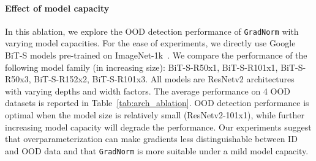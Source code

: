 \documentclass{article}
\begin{document}
\paragraph{Effect of model capacity} In this ablation, we explore the OOD detection performance of \texttt{GradNorm} with varying model capacities. For the ease of experiments, we directly use Google BiT-S models pre-trained on ImageNet-1k~\cite{deng2009imagenet}. We compare the performance of the following model family (in increasing size): BiT-S-R50x1, BiT-S-R101x1, BiT-S-R50x3, BiT-S-R152x2, BiT-S-R101x3. All models are ResNetv2 architectures with varying depths and width factors. The average performance on 4 OOD datasets is reported in Table~\ref{tab:arch_ablation}. OOD detection performance is optimal when the model size is relatively small (ResNetv2-101x1), while further increasing model capacity will degrade the performance. Our experiments suggest that overparameterization can make gradients less distinguishable between ID and OOD data and that \texttt{GradNorm} is more suitable under a mild model capacity.%





\end{document}
